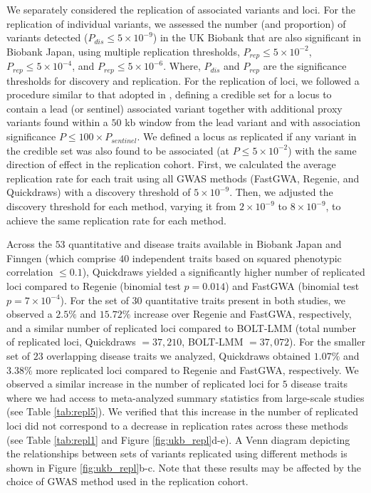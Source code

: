 %
We separately considered the replication of associated variants and loci.
%
For the replication of individual variants, we assessed the number (and proportion) of variants detected ($P_{dis} \leq 5 \times 10^{-9}$) in the UK Biobank that are also significant in Biobank Japan, using multiple replication thresholds, $P_{rep} \leq 5 \times 10^{-2}$, $P_{rep} \leq 5 \times 10^{-4}$, and $P_{rep} \leq 5 \times 10^{-6}$.
%
Where, $P_{dis}$ and $P_{rep}$ are the significance thresholds for discovery and replication.
%
For the replication of loci, we followed a procedure similar to that adopted in \cite{huang2022transferability}, defining a credible set for a locus to contain a lead (or sentinel) associated variant together with additional proxy variants found within a $50$ kb window from the lead variant and with association significance $P \leq 100 \times P_{sentinel}$.
%
We defined a locus as replicated if any variant in the credible set was also found to be associated (at $P \leq 5 \times 10^{-2}$) with the same direction of effect in the replication cohort.
%
First, we calculated the average replication rate for each trait using all GWAS methods (FastGWA, Regenie, and Quickdraws) with a discovery threshold of $5 \times 10^{-9}$.
%
Then, we adjusted the discovery threshold for each method, varying it from $2 \times 10^{-9}$ to $8 \times 10^{-9}$, to achieve the same replication rate for each method.


Across the $53$ quantitative and disease traits available in Biobank Japan and Finngen (which comprise $40$ independent traits based on squared phenotypic correlation $\leq 0.1$), Quickdraws yielded a significantly higher number of replicated loci compared to Regenie (binomial test $p=0.014$) and FastGWA (binomial test $p=7 \times 10^{-4}$).
%
For the set of $30$ quantitative traits present in both studies, we observed a $2.5\%$ and $15.72\%$ increase over Regenie and FastGWA, respectively, and a similar number of replicated loci compared to BOLT-LMM (total number of replicated loci, Quickdraws $=37{,}210$, BOLT-LMM $=37{,}072$).
%
For the smaller set of $23$ overlapping disease traits we analyzed, Quickdraws obtained $1.07\%$ and $3.38\%$ more replicated loci compared to Regenie and FastGWA, respectively.
%
We observed a similar increase in the number of replicated loci for $5$ disease traits where we had access to meta-analyzed summary statistics from large-scale studies (see Table \ref{tab:repl5}).
%
We verified that this increase in the number of replicated loci did not correspond to a decrease in replication rates across these methods (see Table \ref{tab:repl1} and Figure \ref{fig:ukb_repl}d-e).
%
A Venn diagram depicting the relationships between sets of variants replicated using different methods is shown in Figure \ref{fig:ukb_repl}b-c.
%
Note that these results may be affected by the choice of GWAS method used in the replication cohort.

